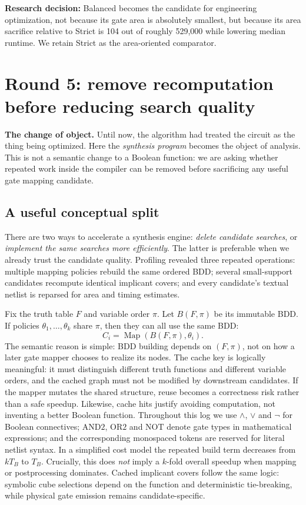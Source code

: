 \textbf{Research decision:} Balanced becomes the candidate for engineering optimization, not because its gate area is absolutely smallest, but because its area sacrifice relative to Strict is 104 out of roughly 529,000 while lowering median runtime. We retain Strict as the area-oriented comparator.

\section{Round 5: remove recomputation before reducing search quality}
\textbf{The change of object.} Until now, the algorithm had treated the circuit as the thing being optimized. Here the \emph{synthesis program} becomes the object of analysis. This is not a semantic change to a Boolean function: we are asking whether repeated work inside the compiler can be removed before sacrificing any useful gate mapping candidate.
\subsection{A useful conceptual split}
There are two ways to accelerate a synthesis engine: \emph{delete candidate searches}, or \emph{implement the same searches more efficiently}. The latter is preferable when we already trust the candidate quality. Profiling revealed three repeated operations: multiple mapping policies rebuild the same ordered BDD; several small-support candidates recompute identical implicant covers; and every candidate's textual netlist is reparsed for area and timing estimates.

Fix the truth table $F$ and variable order $\pi$. Let $B(F,\pi)$ be its immutable BDD. If policies $\theta_1,\ldots,\theta_k$ share $\pi$, then they can all use the same BDD:
\begin{equation}
 C_i=\operatorname{Map}(B(F,\pi),\theta_i).
\end{equation}
The semantic reason is simple: BDD building depends on $(F,\pi)$, not on how a later gate mapper chooses to realize its nodes. The cache key is logically meaningful: it must distinguish different truth functions and different variable orders, and the cached graph must not be modified by downstream candidates. If the mapper mutates the shared structure, reuse becomes a correctness risk rather than a safe speedup. Likewise, cache hits justify avoiding computation, not inventing a better Boolean function. Throughout this log we use $\land$, $\lor$ and $\neg$ for Boolean connectives; $\mathrm{AND2}$, $\mathrm{OR2}$ and $\mathrm{NOT}$ denote gate types in mathematical expressions; and the corresponding monospaced tokens are reserved for literal netlist syntax. In a simplified cost model the repeated build term decreases from $kT_B$ to $T_B$. Crucially, this does \emph{not} imply a $k$-fold overall speedup when mapping or postprocessing dominates. Cached implicant covers follow the same logic: symbolic cube selections depend on the function and deterministic tie-breaking, while physical gate emission remains candidate-specific.

